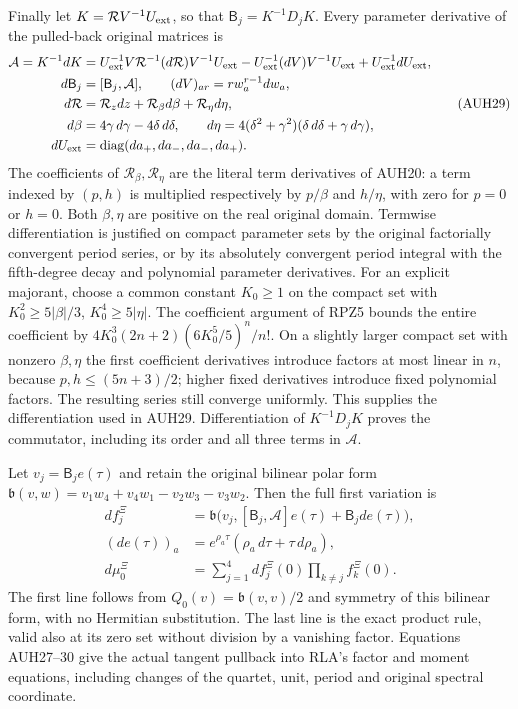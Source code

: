 \documentclass[11pt]{article}
\begin{document}
Finally let $K=\mathcal RV^{-1}U_{\rm ext}$, so that
$\mathsf B_j=K^{-1}D_jK$.
Every parameter derivative of the pulled-back original matrices is
\[
\begin{aligned}
 \mathcal A=K^{-1}dK
 &=U_{\rm ext}^{-1}V\mathcal R^{-1}(d\mathcal R)V^{-1}U_{\rm ext}
   -U_{\rm ext}^{-1}(dV)V^{-1}U_{\rm ext}
   +U_{\rm ext}^{-1}dU_{\rm ext},\\
 d\mathsf B_j&=[\mathsf B_j,\mathcal A],\qquad
 (dV)_{ar}=r w_a^{r-1}dw_a,\\
 d\mathcal R&=\mathcal R_zdz+\mathcal R_\beta d\beta+
                                    \mathcal R_\eta d\eta,\\
 d\beta&=4\gamma\,d\gamma-4\delta\,d\delta,\qquad
 d\eta=4(\delta^2+\gamma^2)(\delta\,d\delta+\gamma\,d\gamma),\\
 dU_{\rm ext}&=\operatorname{diag}(da_+,da_-,da_-,da_+).
\end{aligned}\tag{AUH29}
\]
The coefficients of $\mathcal R_\beta,\mathcal R_\eta$ are the
literal term derivatives of AUH20: a term indexed by $(p,h)$ is
multiplied respectively by $p/\beta$ and $h/\eta$, with zero
for $p=0$ or $h=0$.
Both $\beta,\eta$ are positive on the real original domain.
Termwise differentiation is justified on compact parameter sets by
the original factorially convergent period series, or by its
absolutely convergent period integral with the fifth-degree decay
and polynomial parameter derivatives.  For an explicit majorant,
choose a common constant $K_0\ge1$ on the compact set with
$K_0^2\ge5|\beta|/3$, $K_0^4\ge5|\eta|$.
The coefficient argument of RPZ5 \cite{RPZ005} bounds the entire coefficient
by $4K_0^3(2n+2)(6K_0^5/5)^n/n!$.
On a slightly larger compact set with nonzero $\beta,\eta$ the
first coefficient derivatives introduce factors at most linear in
$n$, because $p,h\le(5n+3)/2$; higher fixed derivatives introduce
fixed polynomial factors.  The resulting series still converge
uniformly.  This supplies the differentiation used in AUH29.
Differentiation of $K^{-1}D_jK$ proves the commutator, including
its order and all three terms in $\mathcal A$.

Let $v_j=\mathsf B_je(\tau)$ and retain the original bilinear
polar form
$\mathfrak b(v,w)=v_1w_4+v_4w_1-v_2w_3-v_3w_2$.
Then the full first variation is
\[
\begin{aligned}
 df_j^{\Xi}&=\mathfrak b\bigl(v_j,
        [\mathsf B_j,\mathcal A]e(\tau)+\mathsf B_jde(\tau)\bigr),\\
 (de(\tau))_a&=e^{\rho_a\tau}(\rho_a\,d\tau+\tau\,d\rho_a),\\
 d\mu_0^{\Xi}&=\sum_{j=1}^4df_j^{\Xi}(0)
                               \prod_{k\ne j}f_k^{\Xi}(0).
\end{aligned}\tag{AUH30}
\]
The first line follows from $Q_0(v)=\mathfrak b(v,v)/2$ and
symmetry of this bilinear form, with no Hermitian substitution.
The last line is the exact product rule, valid also at its zero
set without division by a vanishing factor.
Equations AUH27--30 give the actual tangent pullback into RLA's
factor and moment equations, including changes of the quartet,
unit, period and original spectral coordinate.
\end{document}
